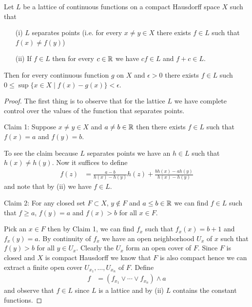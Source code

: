 \begin{lem}Let $L$ be a lattice of continuous functions on a compact
  Hausdorff space $X$ such that 
\begin{itemize}
\item[(i)]$L$ separates points (i.e. for every $x \neq y \in X$ there
  exists $f \in L$ such that $f(x) \neq f(y)$)
\item[(ii)]If $f \in L$ then for every $c \in \mathbb{R}$ we have $cf \in
  L$ and $f + c \in L$.
\end{itemize}
Then for every continuous function $g$ on $X$ and $\epsilon > 0$ there
exists $f \in L$ such $0 \leq \sup \lbrace x \in X \mid f(x) - g(x)
\rbrace < \epsilon$.
\end{lem}
\begin{proof}
The first thing is to observe that for the lattice $L$ we have
complete control over the values of the function that separates points.

Claim 1: Suppose $x \neq y \in X$ and $a \neq b \in \mathbb{R}$ then
there exists $f \in L$ such that $f(x) = a$ and $f(y) = b$.

To see the claim because $L$ separates points we have an $h \in L$
such that $h(x) \neq h(y)$.  Now it suffices to define
\begin{align*}
f(z) &= \frac{a -b}{h(x) - h(y)} h(z) + \frac{b h(x) -a h(y) }{h(x) - h(y)} 
\end{align*}
and note that by (ii) we have $f \in L$.

Claim 2: For any closed set $F \subset X$, $y \notin F$ and $a \leq b
\in \mathbb{R}$ we can find $f \in L$ such that $f \geq a$, $f(y) = a$ and
$f(x) > b$ for all $x \in F$.

Pick an $x \in F$ then by Claim 1, we can find $f_x$ such that $f_x(x)
= b+1$ and $f_x(y) = a$.  By continuity of $f_x$ we have an open
neighborhood $U_x$ of $x$ such that $f(y) > b$ for all $y \in U_x$.
Clearly the $U_x$ form an open cover of $F$.
Since $F$ is closed and $X$ is compact Hausdorff we know that $F$ is
also compact hence we can extract a finite open cover $U_{x_1},
\dotsc,U_{x_n}$ of $F$.  Define
\begin{align*}
f &= (f_{x_1} \vee \cdots \vee f_{x_n}) \wedge a
\end{align*}
and observe that $f \in L$ since $L$ is a lattice and by (ii) $L$
contains the constant functions.


\end{proof}
